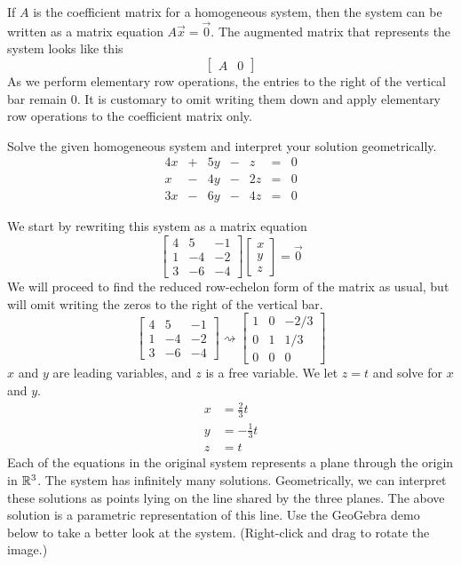 \documentclass{ximera}
\begin{document}
If $A$ is the coefficient matrix for a homogeneous system, then the system can be written as a matrix equation $A\vec{x}=\vec{0}$. The augmented matrix that represents the system looks like this
$$\left[\begin{array}{c|c}  
 A&0
\end{array}\right]$$
As we perform elementary row operations, the entries to the right of the vertical bar remain $0$.  It is customary to omit writing them down and apply elementary row operations to the coefficient matrix only.
\begin{example}\label{ex:homogeneoussys} 
Solve the given homogeneous system and interpret your solution geometrically.
$$\begin{array}{ccccccc}
      4x &+ &5y&-&z&= &0 \\
	 x&- &4y&-&2z&= &0 \\
    3x &- &6y&-&4z&= &0
    \end{array}$$

\begin{explanation}
We start by rewriting this system as a matrix equation
$$\begin{bmatrix}4&5&-1\\1&-4&-2\\3&-6&-4\end{bmatrix}\begin{bmatrix}x\\y\\z\end{bmatrix}=\vec{0}$$
We will proceed to find the reduced row-echelon form of the matrix as usual, but will omit writing the zeros to the right of the vertical bar.
$$\begin{bmatrix}4&5&-1\\1&-4&-2\\3&-6&-4\end{bmatrix}\rightsquigarrow \begin{bmatrix}1&0&-2/3\\0&1&1/3\\0&0&0\end{bmatrix}$$
$x$ and $y$ are leading variables, and $z$ is a free variable.  We let $z=t$ and solve for $x$ and $y$.
\begin{align*}
x&=\frac{2}{3}t\\
y&=-\frac{1}{3}t\\
z&=t
\end{align*}
Each of the equations in the original system represents a plane through the origin in $\mathbb{R}^3$.  The system has infinitely many solutions.  Geometrically, we can interpret these solutions as points lying on the line shared by the three planes.  The above solution is a parametric representation of this line.  Use the GeoGebra demo below to take a better look at the system. (Right-click and drag to rotate the image.)
\begin{center}
  \end{center}

\end{explanation}
\end{example}
\end{document}
